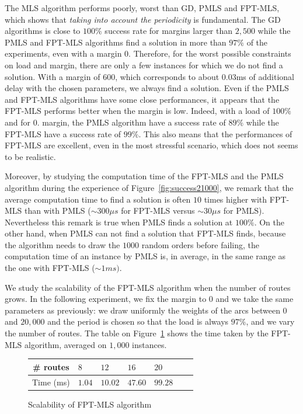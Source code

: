 \documentclass[10pt, conference, letterpaper]{IEEEtran}
\begin{document}
     The MLS algorithm performs poorly, worst than GD, PMLS and FPT-MLS, which shows that \emph{taking into account the periodicity} is fundamental.
     The GD algorithms is close to $100\%$ success rate for margins larger than $2,500$ while the PMLS and FPT-MLS algorithms find a solution in more than $97\%$ of the experiments, even with a margin $0$. Therefore, for the worst possible constraints on load and margin, there are only a few instances for which we do not find a solution. With a margin of $600$, which corresponds to about $0.03$ms of additional delay with the chosen parameters, we always find a solution. 
     Even if the PMLS and FPT-MLS algorithms have some close performances, it appears that the FPT-MLS performs better when the margin is low. Indeed, with a load of $100\%$ and for $0$. margin, the PMLS algorithm have a success rate of $89\%$ while the FPT-MLS have a success rate of $99\%$. This also means that the performances of FPT-MLS are excellent, even in the most stressful scenario, which does not seems to be realistic.
     
     Moreover, by studying the computation time of the FPT-MLS and the PMLS algorithm during the experience of Figure~\ref{fig:success21000}, we remark that the average computation time to find a solution is often $10$ times higher with FPT-MLS than with PMLS ($\sim300\mu s$ for FPT-MLS versus $\sim30\mu s$ for PMLS). Nevertheless this remark is true when PMLS finds a solution at $100\%$. On the other hand, when PMLS can not find a solution that FPT-MLS finds, because the algorithm needs to draw the $1000$ random orders before failing, the computation time of an instance by PMLS is, in average, in the same range as the one with FPT-MLS ($\sim 1ms)$.
     
     We study the scalability of the FPT-MLS algorithm when the number of routes grows. In the following experiment, we fix the margin to $0$ and we take the same parameters as previously: we draw uniformly the weights of the arcs between $0$ and $20,000$ and the period is chosen so that the load is always $97\%$, and we vary the number of routes. The table on Figure~\ref{fig:tps_fpt} shows the time taken by the FPT-MLS algorithm, averaged on $1,000$ instances.
     
          \begin{figure}[h] 
       \begin{center}
   \begin{tabularx}{0.5\textwidth}{|c|X|X|X|X|X|X|}
    \hline
    \# routes& $8$ & $12$ & $16$& $20$\\
    \hline
    Time (ms) & $1.04$ &$10.02$&$47.60$&$99.28$\\
    \hline
      \end{tabularx}
      \end{center}
   \caption{Scalability of FPT-MLS algorithm}
        \label{fig:tps_fpt}
     \end{figure}
\end{document}
